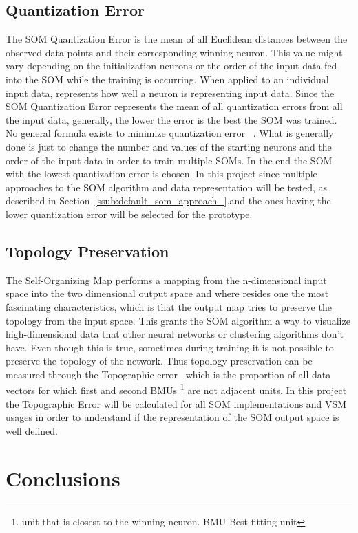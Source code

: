 \subsection{Quantization Error} 
\label{sub:quantization_error}
The SOM Quantization Error is the mean of all Euclidean distances between the observed data points and their corresponding winning neuron. This value might vary depending on the initialization neurons or the order of the input data fed into the SOM while the training is occurring. When applied to an individual input data, represents how well a neuron is representing input data. Since the SOM Quantization Error represents the mean of all quantization errors from all the input data, generally, the lower the error is the best the SOM was trained.
\\
No general formula exists to minimize quantization error~\cite{Bodt} . What is generally done is just to change the number and values of the starting neurons and the order of the input data in order to train multiple SOMs. In the end the SOM with the lowest quantization error is chosen.
In this project since multiple approaches to the SOM algorithm and data representation will be tested, as described in Section~\ref{ssub:default_som_approach_},and the ones having the lower quantization error will be selected for the prototype.

\subsection{Topology Preservation} 
\label{sub:topology_preservation}
The Self-Organizing Map performs a mapping from the n-dimensional input space into the two dimensional output space and where resides one the most fascinating characteristics, which is that the output map tries to preserve the topology from the input space. This grants the SOM algorithm a way to visualize high-dimensional data that other neural networks or clustering algorithms don't have. Even though this is true, sometimes during training it is not possible to preserve the topology of the network.
Thus topology preservation can be measured through the Topographic error~\citet{Kiviluoto1996} which is the proportion of all data vectors for which first and second BMUs \footnote{unit that is closest to the winning neuron. BMU Best fitting unit } are not adjacent units.
In this project the Topographic Error will be calculated for all SOM implementations and VSM usages in order to understand if the representation of the SOM output space is well defined.


\section{Conclusions}

\cleardoublepage
 
